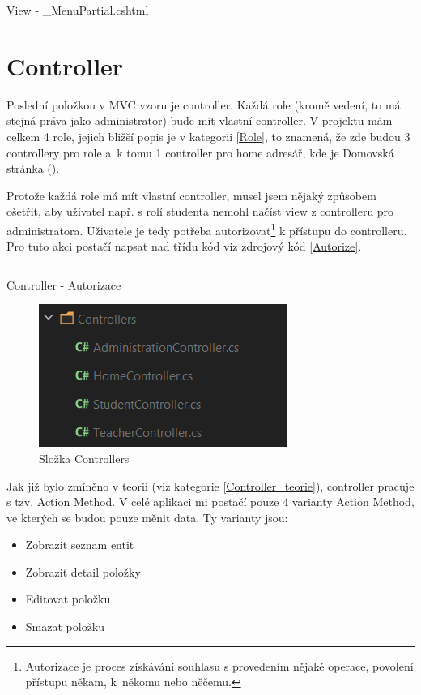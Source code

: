 \documentclass[a4paper, 12pt]{report}
\begin{document}
	\begin{listing}[H]
		\inputminted{html}{SourceCode/Views/Shared/_MenuPartial.html}
		\caption{View - \_MenuPartial.cshtml}
		\label{sharedmenupartial}
	\end{listing}

	\section{Controller}
	Poslední položkou v MVC vzoru je controller. Každá role (kromě vedení, to má stejná práva jako administrator) bude mít vlastní controller. V projektu mám celkem 4 role, jejich bližší popis je v kategorii \ref{Role}, to znamená, že zde budou 3 controllery pro role a~k tomu 1 controller pro home adresář, kde je Domovská stránka ().\par
	Protože každá role má mít vlastní controller, musel jsem nějaký způsobem ošetřit, aby uživatel např. s rolí studenta nemohl načíst view z controlleru pro administratora. Uživatele je tedy potřeba autorizovat\footnote{Autorizace je proces získávání souhlasu s provedením nějaké operace, povolení přístupu někam, k~někomu nebo něčemu.\cite{Autorizace}} k přístupu do controlleru. Pro tuto akci postačí napsat nad třídu kód viz zdrojový kód \ref{Autorize}.
	\begin{listing}[H]
		\inputminted{csharp}{SourceCode/Controllers/Autorize.cs}
		\caption{Controller - Autorizace}
		\label{Autorize}
	\end{listing}
	\begin{figure}[H]
		\centering
		\includegraphics[scale=1]{Contollers}
		\caption{Složka Controllers}
		\label{Controllers}
	\end{figure}
	Jak již bylo zmíněno v teorii (viz kategorie \ref{Controller_teorie}), controller pracuje s tzv. Action Method. V celé aplikaci mi postačí pouze 4 varianty Action Method, ve kterých se budou pouze měnit data. Ty varianty jsou:
	\begin{itemize}
		\item Zobrazit seznam entit
		\item Zobrazit detail položky
		\item Editovat položku
		\item Smazat položku
	\end{itemize}\par
\end{document}
